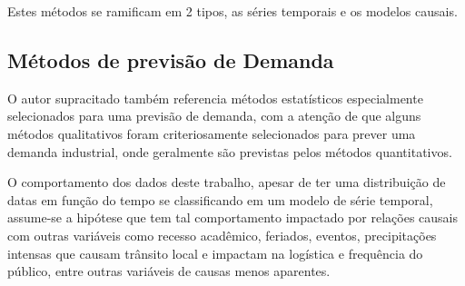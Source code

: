 \documentclass[	12pt, Times, openright, twoside, a4paper, english, brazil]{abntex2}
\begin{document}
          Estes métodos se ramificam em 2 tipos, as séries temporais e os modelos causais.
          \begin{figure}[H]
          \end{figure}

        \subsection{Métodos de previsão de Demanda}
          O autor supracitado também referencia métodos estatísticos especialmente selecionados para uma previsão de demanda, com a atenção de que alguns métodos qualitativos foram criteriosamente selecionados para prever uma demanda industrial, onde geralmente são previstas pelos métodos quantitativos.

          O comportamento dos dados deste trabalho, apesar de ter uma distribuição de datas em função do tempo se classificando em um modelo de série temporal, assume-se a hipótese que tem tal comportamento impactado por relações causais com outras variáveis como recesso acadêmico, feriados, eventos, precipitações intensas que causam trânsito local e impactam na logística e frequência do público, entre outras variáveis de causas menos aparentes.

          \begin{figure}[H]
          \end{figure}
\end{document}
